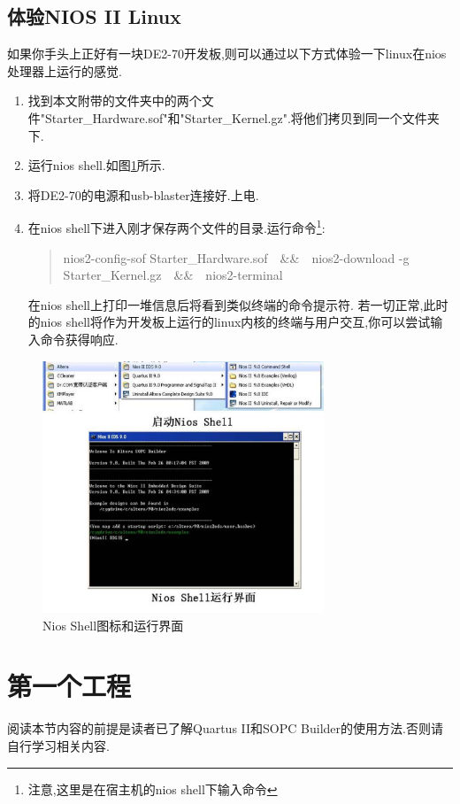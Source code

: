 \documentclass[12pt,a4paper,titlepage]{article}
\begin{document}
\subsection{体验NIOS II Linux}
如果你手头上正好有一块DE2-70开发板,则可以通过以下方式体验一下linux在nios处理器上运行的感觉.
\begin{enumerate}
\item 找到本文附带的文件夹中的两个文件"Starter\_Hardware.sof"和"Starter\_Kernel.gz".将他们拷贝到同一个文件夹下.
\item 运行nios shell.如图\ref{ns}所示.
\item 将DE2-70的电源和usb-blaster连接好.上电.
\item 在nios shell下进入刚才保存两个文件的目录.{运行命令}\footnote{注意,这里是在宿主机的nios shell下输入命令}:
\begin{verse}
nios2-config-sof Starter\_Hardware.sof\ {}\ {}\&\&\ {}\ {}nios2-download -g Starter\_Kernel.gz\ {}\ {}\&\&\ {}\ {}nios2-terminal
\end{verse}
在nios shell上打印一堆信息后将看到类似终端的命令提示符.
若一切正常,此时的nios shell将作为开发板上运行的linux内核的终端与用户交互,你可以尝试输入命令获得响应.
\end{enumerate}
\begin{figure}[!htbp]
\centering
\includegraphics[width=0.75\textwidth,scale=0.75]{pic/f_shell_and_icon.eps}
\caption{Nios Shell图标和运行界面\label{ns}}
\end{figure}
\newpage{}
\section{第一个工程}
阅读本节内容的前提是读者已了解Quartus II和SOPC Builder的使用方法.否则请自行学习相关内容.
\end{document}
